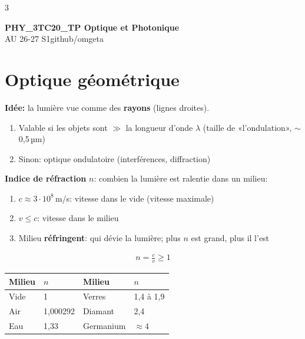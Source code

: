 \documentclass[12pt, a4paper]{article}
\newcommand{\mytitle}{PHY\_3TC20\_TP Optique et Photonique}
\newcommand{\myauthor}{github/omgeta}
\newcommand{\mydate}{AU 26-27 S1}
\begin{document}
\raggedright
\raggedcolumns
\footnotesize
\begin{multicols*}{3}
	\setlength{\premulticols}{1pt}
	\setlength{\postmulticols}{1pt}
	\setlength{\multicolsep}{1pt}
	\setlength{\columnsep}{2pt}

	{\normalsize{\textbf{\mytitle}}}\\
	{\footnotesize{\mydate\hspace{2pt}\textemdash\hspace{2pt}\myauthor}}

	\section{Optique géométrique}
	\textbf{Idée:} la lumière vue comme des \textbf{rayons} (lignes droites).
	\begin{enumerate}[\roman*.]
		\item Valable si les objets sont $\gg$ la longueur d'onde $\lambda$ (taille de «l'ondulation», $\sim$0,5\,µm)
		\item Sinon: optique ondulatoire (interférences, diffraction)
	\end{enumerate}

	\textbf{Indice de réfraction} $n$: combien la lumière est ralentie dans un milieu:
	\begin{enumerate}[\roman*.]
		\item $c\approx3\cdot10^8$\,m/s: vitesse dans le vide (vitesse maximale)
		\item $v\leq c$: vitesse dans le milieu
		\item Milieu \textbf{réfringent}: qui dévie la lumière; plus $n$ est grand, plus il l'est
	\end{enumerate}
	\begin{gather*}
		n=\frac{c}{v}\geq1
	\end{gather*}
	\begin{tabular}{|l|l||l|l|}
		\hline
		\textbf{Milieu} & $n$      & \textbf{Milieu} & $n$        \\
		\hline
		Vide            & 1        & Verres          & 1,4 à 1,9  \\
		Air             & 1,000292 & Diamant         & 2,4        \\
		Eau             & 1,33     & Germanium       & $\approx4$ \\
		\hline
	\end{tabular}


\end{multicols*}
\end{document}
